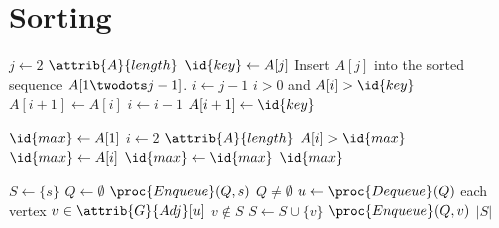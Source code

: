 \documentclass{article}
\begin{document}
\section{Sorting}
\begin{codebox}
\li \For $j \gets 2$ \To $\attrib{A}{length}$
\li     \Do
            $\id{key} \gets A[j]$
\li         \Comment Insert $A[j]$ into the sorted sequence $A[1 \twodots j-1]$.
\li         $i \gets j-1$
\li         \While $i > 0$ and $A[i] > \id{key}$
\li             \Do
                    $A[i+1] \gets A[i]$
\li                 $i \gets i-1$
                \End
\li         $A[i+1] \gets \id{key}$
        \End
\end{codebox}
\begin{codebox}
\li $\id{max} \gets A[1]$
\li \For $i \gets 2$ \To $\attrib{A}{length}$
\li     \Do \If $A[i] > \id{max}$
\li             \Then $\id{max} \gets A[i]$
\li             \Else $\id{max} \gets \id{max}$
                \End
        \End
\li \Return $\id{max}$
\end{codebox}
\begin{codebox}
\li $S \gets \{s\}$
\li $Q \gets \emptyset$
\li $\proc{Enqueue}(Q, s)$
\li \While $Q \neq \emptyset$
\li     \Do
            $u \gets \proc{Dequeue}(Q)$
\li         \For each vertex $v \in \attrib{G}{Adj}[u]$
\li             \Do \If $v \notin S$
\li                     \Then $S \gets S \cup \{v\}$
\li                         $\proc{Enqueue}(Q, v)$
                        \End
                \End
        \End
\li \Return $|S|$
\end{codebox}
\end{document}
